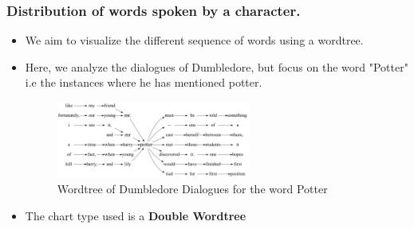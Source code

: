 \documentclass[a4paper]{article}
\begin{document}
\subsubsection{Distribution of words spoken by a character.}
\begin{itemize}
    \item We aim to visualize the different sequence of words using a wordtree.
    \item Here, we analyze the dialogues of Dumbledore, but focus on the word "Potter" i.e the instances where he has mentioned potter.
    \begin{figure}[H]
        \centering
        \includegraphics[width=0.6\textwidth]{potter.gv}
        \caption{Wordtree of Dumbledore Dialogues for the word Potter}
        \label{fig:potter}
    \end{figure}
    \item The chart type used is a \textbf{Double Wordtree}  
\end{itemize}
\end{document}
